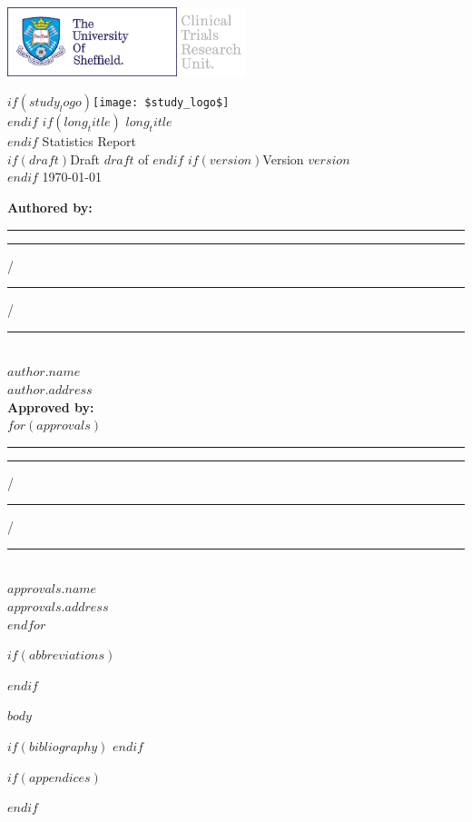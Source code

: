 \documentclass[11pt,a4paper,british]{article}
\begin{document}
\thispagestyle{empty}

\includegraphics[height=2cm]{Images/TUOSLogo}\includegraphics[height=2cm]{Images/CTRULogo}
\begin{center}
$if(study_logo) $\texttt{[image: \$study\_logo\$]}\\ $endif$
$if(long_title)$ $long_title$\\[5mm] $endif$
{\Huge Statistics Report}\\
$if(draft)${\Large Draft $draft$ of }$endif$ $if(version)${\Large Version $version$}\\$endif$
{\Large \today}
\end{center}

\begin{singlespace}
\textbf{Authored by:}\\[1cm]
\rule{5cm}{1pt}\hspace{5cm}\rule{1cm}{1pt} /\rule{1cm}{1pt} /\rule{2cm}{1pt}\\
\textit{$author.name$\\
$author.address$}\\[3mm]
\textbf{Approved by:}\\[1cm]
$for(approvals)$
\rule{5cm}{1pt}\hspace{5cm}\rule{1cm}{1pt} /\rule{1cm}{1pt} /\rule{2cm}{1pt}\\
\textit{$approvals.name$\\
$approvals.address$}\\[1cm]
$endfor$
\end{singlespace}

\clearpage
{}
\tableofcontents
\listoftables
\listoffigures

$if(abbreviations)$

$endif$

\clearpage
{}

$body$

$if(bibliography)$
\printbibliography
$endif$

$if(appendices)$
\begin{appendices}



\end{appendices}
$endif$
\end{document}
